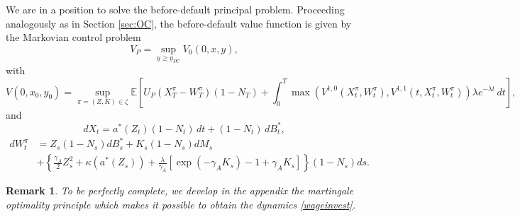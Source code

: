 \documentclass[numbook, envcountsect, envcountsame, envcountreset, runningheads, smallextended]{article}
\newtheorem{Remark}{Remark}[part]
\def \E{\mathbb{E}}
\begin{document}
We are in a position to solve the before-default principal problem. Proceeding analogously as in Section \ref{sec:OC}, the before-default value function is given by the Markovian control problem
$$
V_P=\sup_{y \ge y_{PC}}V_0(0,x,y),
$$
with
\begin{equation}
V(0,x_0,y_0)=\sup_{\pi=(Z,K) \in \zeta} \E\left[ U_P(X_{T}^{\pi} - W_{T}^{\pi} )(1-N_T)+\int_0^T \max(V^{1,0}(X_t^\pi,W_t^{\pi}),V^{1,1}(t,X_t^\pi,W_t^{\pi}))\lambda e^{-\lambda t}\,dt \right],
\end{equation}
and 
$$
dX_t=a^*(Z_t)(1-N_t)\,dt+(1-N_t)\,dB_t^*,
$$
\begin{align}\label{wageinvest}
dW^{\pi}_t &=  Z_s(1-N_s) dB_s^* + K_s(1-N_s) dM_s \\
&+ \left\{ \frac{\gamma_A}{2}   Z_s^2 + \kappa(a^*(Z_s))+ \frac{\lambda}{\gamma_A} [\exp(-\gamma_A K_s) - 1 + \gamma_A K_s ] \right\} (1-N_s)ds.\nonumber
\end{align}
\begin{Remark} To be perfectly complete, we develop in the appendix the martingale optimality principle which makes it possible to obtain the dynamics \eqref{wageinvest}.
\end{Remark}
\end{document}
